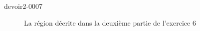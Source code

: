 \begin{corrige}{devoir2-0007}
\begin{figure}
  \begin{center}

  \caption{La région décrite dans la deuxième partie de l'exercice 6}\label{exo6devoir2deux}
  \end{center}
 
  \end{figure}

\end{corrige}
